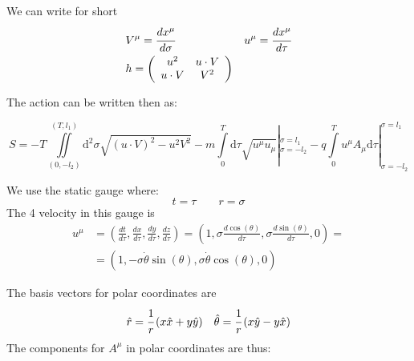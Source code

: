 \documentclass[11pt,a4paper]{article}
\begin{document}
We can write for short \begin{align*}
&V^{\mu}=\cfrac{dx^{\mu}}{d\sigma} & u^{\mu}=\cfrac{dx^{\mu}}{d\tau} \\
&h=\left(\begin{array}{cc} u^{2} & u\cdot V\\ u\cdot V & V^{2} \end{array}\right)
\end{align*} 

The action can be written then as:

\begin{equation}
S=-T\iint\limits_{(0,-l_{2})}^{(T,l_{1})}\mathrm{d}^{2}\sigma\sqrt{\left(u\cdot V\right)^{2}-u^{2}V^{2}}-m\int\limits_{0}^{T}\mathrm{d}\tau\sqrt{u^{\mu}u_{\mu}}|_{\sigma=-l_{2}}^{\sigma=l_{1}}-q\int\limits_{0}^{T}u^{\mu}A_{\mu}\mathrm{d}\tau|_{\sigma=-l_{2}}^{\sigma=l_{1}} 
\end{equation}
 
We use the static gauge where:
\begin{equation}
\label{eq:staticqauge}
t=\tau \qquad r=\sigma
\end{equation}
The 4 velocity in this gauge is
\begin{align*}
u^{\mu}&=\left(\frac{dt}{d\tau},\frac{dx}{d\tau},\frac{dy}{d\tau},\frac{dz}{d\tau}\right)
=\left(1,\sigma\frac{d\cos\left(\theta\right)}{d\tau},\sigma\frac{d\sin\left(\theta\right)}{d\tau},0\right)=\\
&=\left(1,-\sigma\dot{\theta}\sin\left(\theta\right),\sigma\dot{\theta}\cos\left(\theta\right),0\right)
\end{align*}

The basis vectors for polar coordinates are
\begin{align*}
&\hat{r}=\cfrac{1}{r}\left(x\hat{x}+y\hat{y}\right) & \hat{\theta}=\cfrac{1}{r}\left(x\hat{y}-y\hat{x}\right)
\end{align*}
The components for $ A^{\mu} $ in polar coordinates are thus:
\end{document}
